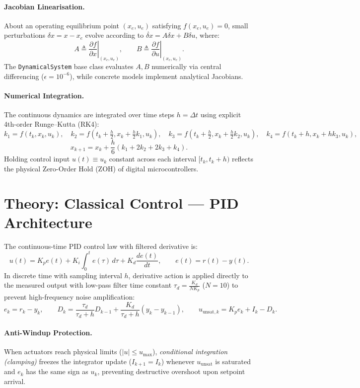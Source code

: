 \documentclass[11pt,a4paper]{article}
\begin{document}
\paragraph{Jacobian Linearisation.} About an operating equilibrium point $(x_e, u_e)$ satisfying $f(x_e, u_e) = 0$, small perturbations $\delta x = x - x_e$ evolve according to $\dot{\delta x} = A \delta x + B \delta u$, where:
\[
A \triangleq \left.\frac{\partial f}{\partial x}\right|_{(x_e, u_e)}, \qquad
B \triangleq \left.\frac{\partial f}{\partial u}\right|_{(x_e, u_e)} .
\]
The \texttt{DynamicalSystem} base class evaluates $A, B$ numerically via central differencing ($\epsilon = 10^{-6}$), while concrete models implement analytical Jacobians.

\paragraph{Numerical Integration.} The continuous dynamics are integrated over time steps $h = \Delta t$ using explicit 4th-order Runge--Kutta (RK4):
\[
k_1 = f(t_k, x_k, u_k), \quad
k_2 = f\left(t_k + \tfrac{h}{2}, x_k + \tfrac{h}{2}k_1, u_k\right), \quad
k_3 = f\left(t_k + \tfrac{h}{2}, x_k + \tfrac{h}{2}k_2, u_k\right), \quad
k_4 = f(t_k + h, x_k + h k_3, u_k),
\]
\[
x_{k+1} = x_k + \frac{h}{6}\left(k_1 + 2k_2 + 2k_3 + k_4\right) .
\]
Holding control input $u(t) \equiv u_k$ constant across each interval $[t_k, t_k + h)$ reflects the physical Zero-Order Hold (ZOH) of digital microcontrollers.

\section{Theory: Classical Control --- PID Architecture}

The continuous-time PID control law with filtered derivative is:
\[
u(t) = K_p e(t) + K_i \int_0^t e(\tau)\,d\tau + K_d \frac{de(t)}{dt}, \qquad e(t) = r(t) - y(t) .
\]
In discrete time with sampling interval $h$, derivative action is applied directly to the measured output with low-pass filter time constant $\tau_d = \frac{K_d}{N K_p}$ ($N=10$) to prevent high-frequency noise amplification:
\[
e_k = r_k - y_k, \qquad
D_k = \frac{\tau_d}{\tau_d + h} D_{k-1} + \frac{K_d}{\tau_d + h}(y_k - y_{k-1}), \qquad
u_{\text{unsat}, k} = K_p e_k + I_k - D_k .
\]

\paragraph{Anti-Windup Protection.} When actuators reach physical limits ($|u| \le u_{\max}$), \emph{conditional integration (clamping)} freezes the integrator update ($I_{k+1} = I_k$) whenever $u_{\text{unsat}}$ is saturated and $e_k$ has the same sign as $u_k$, preventing destructive overshoot upon setpoint arrival.
\end{document}

